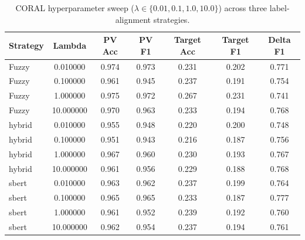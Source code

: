 \begin{table}[htbp]
\caption{CORAL hyperparameter sweep ($\lambda \in \{0.01, 0.1, 1.0, 10.0\}$) across three label-alignment strategies.}
\label{tab:coral_sweep}
\begin{tabular}{lcccccc}
\toprule
Strategy & Lambda & PV Acc & PV F1 & Target Acc & Target F1 & Delta F1 \\
\midrule
Fuzzy & 0.010000 & 0.974 & 0.973 & 0.231 & 0.202 & 0.771 \\
Fuzzy & 0.100000 & 0.961 & 0.945 & 0.237 & 0.191 & 0.754 \\
Fuzzy & 1.000000 & 0.975 & 0.972 & 0.267 & 0.231 & 0.741 \\
Fuzzy & 10.000000 & 0.970 & 0.963 & 0.233 & 0.194 & 0.768 \\
hybrid & 0.010000 & 0.955 & 0.948 & 0.220 & 0.200 & 0.748 \\
hybrid & 0.100000 & 0.951 & 0.943 & 0.216 & 0.187 & 0.756 \\
hybrid & 1.000000 & 0.967 & 0.960 & 0.230 & 0.193 & 0.767 \\
hybrid & 10.000000 & 0.961 & 0.956 & 0.229 & 0.188 & 0.768 \\
sbert & 0.010000 & 0.963 & 0.962 & 0.237 & 0.199 & 0.764 \\
sbert & 0.100000 & 0.965 & 0.965 & 0.233 & 0.187 & 0.777 \\
sbert & 1.000000 & 0.961 & 0.952 & 0.239 & 0.192 & 0.760 \\
sbert & 10.000000 & 0.962 & 0.954 & 0.237 & 0.194 & 0.761 \\
\bottomrule
\end{tabular}
\end{table}
